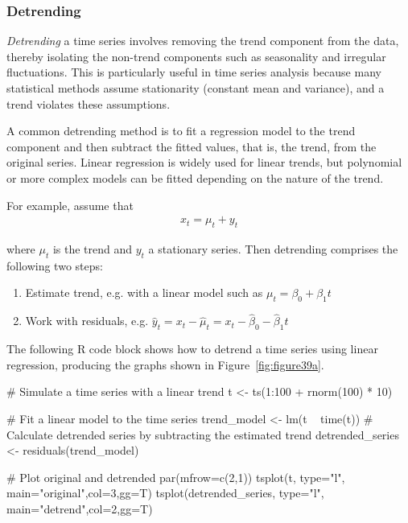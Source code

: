 \subsubsection*{Detrending}

\emph{Detrending} a time series involves removing the trend component from the data, thereby isolating the non-trend components such as seasonality and irregular fluctuations. This is particularly useful in time series analysis because many statistical methods assume stationarity (constant mean and variance), and a trend violates these assumptions.

A common detrending method is to fit a regression model to the trend component and then subtract the fitted values, that is, the trend, from the original series. Linear regression is widely used for linear trends, but polynomial or more complex models can be fitted depending on the nature of the trend.

For example, assume that 
\begin{align*}
x_t = \mu_t + y_t
\end{align*}

where $\mu_t$ is the trend and $y_t$ a stationary series. Then detrending comprises the following two steps:

\begin{enumerate}
  \item Estimate trend, e.g. with a linear model such as $\mu_t = \beta_0 + \beta_1 t$
  \item Work with residuals, e.g. $\hat y_t = x_t - \hat \mu_t = x_t - \hat\beta_0 - \hat\beta_1 t$
\end{enumerate}

The following R code block shows how to detrend a time series using linear regression, producing the graphs shown in Figure~\ref{fig:figure39a}.

\begin{samepage}
\begin{Rcode}
# Simulate a time series with a linear trend
t <- ts(1:100 + rnorm(100) * 10)

# Fit a linear model to the time series
trend_model <- lm(t ~ time(t))
# Calculate detrended series by subtracting the estimated trend
detrended_series <- residuals(trend_model)

# Plot original and detrended
par(mfrow=c(2,1))
tsplot(t, type="l", main="original",col=3,gg=T)
tsplot(detrended_series, type="l", main="detrend",col=2,gg=T)
\end{Rcode}
\end{samepage}

